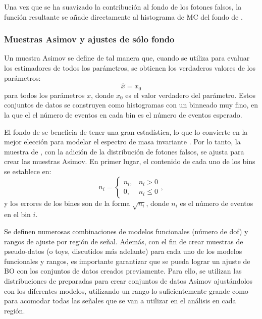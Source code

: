 Una vez que se ha suavizado la contribución al fondo de los fotones falsos, la función resultante se añade directamente al histograma de \ac{MC} del fondo de \gammajet.







\subsubsection{Muestras Asimov y ajustes de sólo fondo}
\label{subsubsec:bkg:modeling:preparation:asimov_bkgonly}

Un muestra Asimov se define de tal manera que, cuando se utiliza para evaluar los estimadores de todos los parámetros, se obtienen los verdaderos valores de los parámetros:
\begin{equation}
    \hat{x} = x_0
\end{equation}
para todos los parámetros \(x\), donde \(x_0\) es el valor verdadero del parámetro. Estos conjuntos de datos se construyen como histogramas con un binneado muy fino, en la que el el número de eventos en cada bin es el número de eventos esperado.

El fondo de \gammajet se beneficia de tener una gran estadística, lo que lo convierte en la mejor elección para modelar el espectro de masa invariante \gammajet. Por lo tanto, la muestra de \gammajet, con la adición de la distribución de fotones falsos, se ajusta para crear las muestras Asimov. En primer lugar, el contenido de cada uno de los bins se establece en:
\begin{equation}
    n_i = 
    \begin{cases}
        n_i, & n_i > 0\\
        0, & n_i \leq 0
    \end{cases},
\end{equation}
y los errores de los bines son de la forma \(\sqrt{n_i}\), donde \(n_i\) es el número de eventos en el bin \(i\).


Se definen numerosas combinaciones de modelos funcionales (número de \ac{dof}) y rangos de ajuste por región de señal. Además, con el fin de crear muestras de pseudo-datos (o toys, discutidos más adelante) para cada uno de los modelos funcionales y rangos, es importante garantizar que se pueda lograr un ajuste de \ac{BO} con los conjuntos de datos creados previamente.
Para ello, se utilizan las distribuciones de \myj preparadas para crear conjuntos de datos Asimov ajustándolos con los diferentes modelos, utilizando un rango lo suficientemente grande como para acomodar todas las señales que se van a utilizar en el análisis en cada región.

